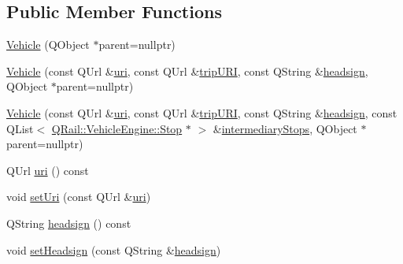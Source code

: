 \subsection*{Public Member Functions}
\begin{DoxyCompactItemize}
\item 
\mbox{\hyperlink{classQRail_1_1VehicleEngine_1_1Vehicle_a2e60c2ba58eb0c841d2d22624917ec06}{Vehicle}} (Q\+Object $\ast$parent=nullptr)
\item 
\mbox{\hyperlink{classQRail_1_1VehicleEngine_1_1Vehicle_af389f937fe809dddddd9dcf88794d177}{Vehicle}} (const Q\+Url \&\mbox{\hyperlink{classQRail_1_1VehicleEngine_1_1Vehicle_a80c5d4f38c97919e573439b94067d099}{uri}}, const Q\+Url \&\mbox{\hyperlink{classQRail_1_1VehicleEngine_1_1Vehicle_a9de1a7504e0e32802812350f7d0ced34}{trip\+U\+RI}}, const Q\+String \&\mbox{\hyperlink{classQRail_1_1VehicleEngine_1_1Vehicle_a43ab0cc2f24db5e77174e6c84a9d7300}{headsign}}, Q\+Object $\ast$parent=nullptr)
\item 
\mbox{\hyperlink{classQRail_1_1VehicleEngine_1_1Vehicle_a58ea75f1cc275d8f800ea449b09cf339}{Vehicle}} (const Q\+Url \&\mbox{\hyperlink{classQRail_1_1VehicleEngine_1_1Vehicle_a80c5d4f38c97919e573439b94067d099}{uri}}, const Q\+Url \&\mbox{\hyperlink{classQRail_1_1VehicleEngine_1_1Vehicle_a9de1a7504e0e32802812350f7d0ced34}{trip\+U\+RI}}, const Q\+String \&\mbox{\hyperlink{classQRail_1_1VehicleEngine_1_1Vehicle_a43ab0cc2f24db5e77174e6c84a9d7300}{headsign}}, const Q\+List$<$ \mbox{\hyperlink{classQRail_1_1VehicleEngine_1_1Stop}{Q\+Rail\+::\+Vehicle\+Engine\+::\+Stop}} $\ast$ $>$ \&\mbox{\hyperlink{classQRail_1_1VehicleEngine_1_1Vehicle_ae35c9003264f8189f69485ec569af6bd}{intermediary\+Stops}}, Q\+Object $\ast$parent=nullptr)
\item 
Q\+Url \mbox{\hyperlink{classQRail_1_1VehicleEngine_1_1Vehicle_a80c5d4f38c97919e573439b94067d099}{uri}} () const
\item 
void \mbox{\hyperlink{classQRail_1_1VehicleEngine_1_1Vehicle_a2ad17e7dee2d1130420734ed7e5b9330}{set\+Uri}} (const Q\+Url \&\mbox{\hyperlink{classQRail_1_1VehicleEngine_1_1Vehicle_a80c5d4f38c97919e573439b94067d099}{uri}})
\item 
Q\+String \mbox{\hyperlink{classQRail_1_1VehicleEngine_1_1Vehicle_a43ab0cc2f24db5e77174e6c84a9d7300}{headsign}} () const
\item 
void \mbox{\hyperlink{classQRail_1_1VehicleEngine_1_1Vehicle_a699a7d8cd3a6a665554cff78d7ce1472}{set\+Headsign}} (const Q\+String \&\mbox{\hyperlink{classQRail_1_1VehicleEngine_1_1Vehicle_a43ab0cc2f24db5e77174e6c84a9d7300}{headsign}})

\end{DoxyCompactItemize}
